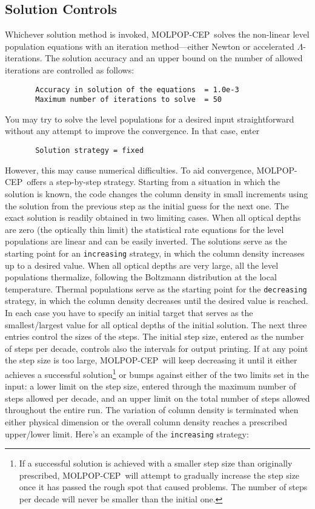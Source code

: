 \documentclass[12pt]{article}
\def\M{MOLPOP-CEP}
\begin{document}
\subsection{Solution Controls}

Whichever solution method is invoked, \M\ solves the non-linear level
population equations with an iteration method---either Newton or accelerated
$\Lambda$-iterations. The solution accuracy and an upper bound on the number of
allowed iterations are controlled as follows:
%
\begin{verbatim}
       Accuracy in solution of the equations  = 1.0e-3
       Maximum number of iterations to solve  = 50
\end{verbatim}
You may try to solve the level populations for a desired input straightforward
without any attempt to improve the convergence. In that case, enter
\begin{verbatim}
       Solution strategy = fixed
\end{verbatim}
However, this may cause numerical difficulties. To aid convergence, \M\ offers
a step-by-step strategy. Starting from a situation in which the solution is
known, the code changes the column density in small increments using the
solution from the previous step as the initial guess for the next one. The
exact solution is readily obtained in two limiting cases. When all optical
depths are zero (the optically thin limit) the statistical rate equations for
the level populations are linear and can be easily inverted. The solutions
serve as the starting point for an {\tt increasing} strategy, in which the
column density increases up to a desired value. When all optical depths are
very large, all the level populations thermalize, following the Boltzmann
distribution at the local temperature. Thermal populations serve as the
starting point for the {\tt decreasing} strategy, in which the column density
decreases until the desired value is reached. In each case you have to specify
an initial target that serves as the smallest/largest value for all optical
depths of the initial solution. The next three entries control the sizes of the
steps. The initial step size, entered as the number of steps per decade,
controls also the intervals for output printing. If at any point the step size
is too large, \M\ will keep decreasing it until it either achieves a successful
solution\footnote{If a successful solution is achieved with a smaller step size
than originally prescribed, \M\ will attempt to gradually increase the step
size once it has passed the rough spot that caused problems. The number of
steps per decade will never be smaller than the initial one.} or bumps against
either of the two limits set in the input: a lower limit on the step size,
entered through the maximum number of steps allowed per decade, and an upper
limit on the total number of steps allowed throughout the entire run. The
variation of column density is terminated when either physical dimension or the
overall column density reaches a prescribed upper/lower limit. Here's an
example of the {\tt increasing} strategy:
\end{document}
